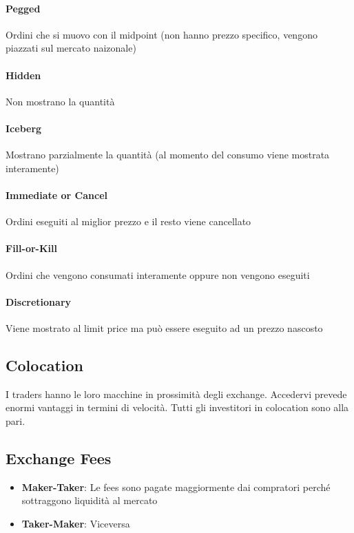 \documentclass[12pt]{article}
\begin{document}
\paragraph{Pegged} Ordini che si muovo con il midpoint (non hanno prezzo specifico, vengono piazzati sul mercato naizonale)
\paragraph{Hidden} Non mostrano la quantità
\paragraph{Iceberg} Mostrano parzialmente la quantità (al momento del consumo viene mostrata interamente)
\paragraph{Immediate or Cancel} Ordini eseguiti al miglior prezzo e il resto viene cancellato
\paragraph{Fill-or-Kill} Ordini che vengono consumati interamente oppure non vengono eseguiti
\paragraph{Discretionary} Viene mostrato al limit price ma può essere eseguito ad un prezzo nascosto
\subsection{Colocation}
I traders hanno le loro macchine in prossimità degli exchange. Accedervi prevede enormi vantaggi in termini di velocità. Tutti gli investitori in colocation sono alla pari.
\subsection{Exchange Fees}
\begin{itemize}
    \item \textbf{Maker-Taker}: Le fees sono pagate maggiormente dai compratori perché sottraggono liquidità al mercato
    \item \textbf{Taker-Maker}: Viceversa
\end{itemize}
\end{document}
